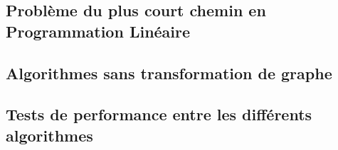 \subsection{Problème du plus court chemin en Programmation Linéaire}
\label{sec:plus-court-pl}

\subsection{Algorithmes sans transformation de graphe}
\label{sec:algos-sans-transfo}

\subsection{Tests de performance entre les différents algorithmes}
\label{sec:tests}


